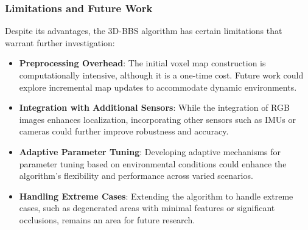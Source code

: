 \subsubsection{Limitations and Future Work}
Despite its advantages, the 3D-BBS algorithm has certain limitations that warrant further investigation:

\begin{itemize}
    \item \textbf{Preprocessing Overhead}: The initial voxel map construction is computationally intensive, although it is a one-time cost. Future work could explore incremental map updates to accommodate dynamic environments.
    \item \textbf{Integration with Additional Sensors}: While the integration of RGB images enhances localization, incorporating other sensors such as IMUs or cameras could further improve robustness and accuracy.
    \item \textbf{Adaptive Parameter Tuning}: Developing adaptive mechanisms for parameter tuning based on environmental conditions could enhance the algorithm's flexibility and performance across varied scenarios.
    \item \textbf{Handling Extreme Cases}: Extending the algorithm to handle extreme cases, such as degenerated areas with minimal features or significant occlusions, remains an area for future research.
\end{itemize}

